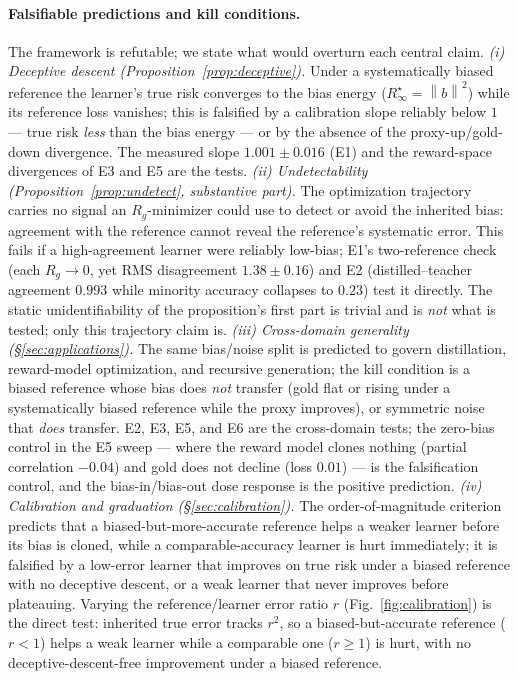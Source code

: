 \documentclass[10pt]{article} %
\theoremstyle{plain}
\theoremstyle{remark}
\newcommand{\norm}[1]{\left\lVert #1 \right\rVert}
\begin{document}
\paragraph{Falsifiable predictions and kill conditions.} The framework is refutable; we state what would overturn each central claim. \emph{(i) Deceptive descent (Proposition~\ref{prop:deceptive}).} Under a systematically biased reference the learner's true risk converges to the bias energy ($R^\star_\infty=\norm{b}^2$) while its reference loss vanishes; this is falsified by a calibration slope reliably below $1$ --- true risk \emph{less} than the bias energy --- or by the absence of the proxy-up/gold-down divergence. The measured slope $1.001\pm0.016$ (E1) and the reward-space divergences of E3 and E5 are the tests. \emph{(ii) Undetectability (Proposition~\ref{prop:undetect}, substantive part).} The optimization trajectory carries no signal an $R_g$-minimizer could use to detect or avoid the inherited bias: agreement with the reference cannot reveal the reference's systematic error. This fails if a high-agreement learner were reliably low-bias; E1's two-reference check (each $R_g\to0$, yet RMS disagreement $1.38\pm0.16$) and E2 (distilled--teacher agreement $0.993$ while minority accuracy collapses to $0.23$) test it directly. The static unidentifiability of the proposition's first part is trivial and is \emph{not} what is tested; only this trajectory claim is. \emph{(iii) Cross-domain generality (\S\ref{sec:applications}).} The same bias/noise split is predicted to govern distillation, reward-model optimization, and recursive generation; the kill condition is a biased reference whose bias does \emph{not} transfer (gold flat or rising under a systematically biased reference while the proxy improves), or symmetric noise that \emph{does} transfer. E2, E3, E5, and E6 are the cross-domain tests; the zero-bias control in the E5 sweep --- where the reward model clones nothing (partial correlation $-0.04$) and gold does not decline (loss $0.01$) --- is the falsification control, and the bias-in/bias-out dose response is the positive prediction. \emph{(iv) Calibration and graduation (\S\ref{sec:calibration}).} The order-of-magnitude criterion predicts that a biased-but-more-accurate reference helps a weaker learner before its bias is cloned, while a comparable-accuracy learner is hurt immediately; it is falsified by a low-error learner that improves on true risk under a biased reference with no deceptive descent, or a weak learner that never improves before plateauing. Varying the reference/learner error ratio $r$ (Fig.~\ref{fig:calibration}) is the direct test: inherited true error tracks $r^2$, so a biased-but-accurate reference ($r<1$) helps a weak learner while a comparable one ($r\ge1$) is hurt, with no deceptive-descent-free improvement under a biased reference.
\end{document}
